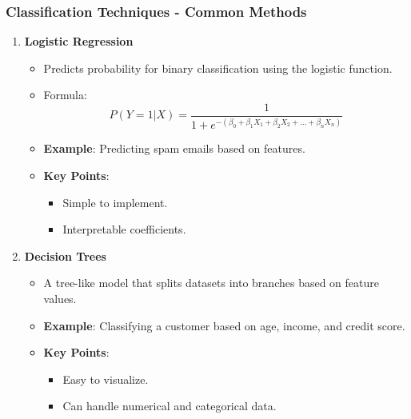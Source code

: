 \documentclass[aspectratio=169]{beamer}
\begin{document}
\begin{frame}[fragile]
    \frametitle{Classification Techniques - Common Methods}
    \begin{enumerate}
        \item \textbf{Logistic Regression}
        \begin{itemize}
            \item Predicts probability for binary classification using the logistic function.
            \item Formula: 
            \begin{equation}
                P(Y=1 | X) = \frac{1}{1 + e^{-(\beta_0 + \beta_1X_1 + \beta_2X_2 + ... + \beta_nX_n)}}
            \end{equation}
            \item \textbf{Example}: Predicting spam emails based on features.
            \item \textbf{Key Points}:
                \begin{itemize}
                    \item Simple to implement.
                    \item Interpretable coefficients.
                \end{itemize}
        \end{itemize}

        \item \textbf{Decision Trees}
        \begin{itemize}
            \item A tree-like model that splits datasets into branches based on feature values.
            \item \textbf{Example}: Classifying a customer based on age, income, and credit score.
            \item \textbf{Key Points}:
                \begin{itemize}
                    \item Easy to visualize.
                    \item Can handle numerical and categorical data.
                \end{itemize}
        \end{itemize}
    \end{enumerate}
\end{frame}
\end{document}
